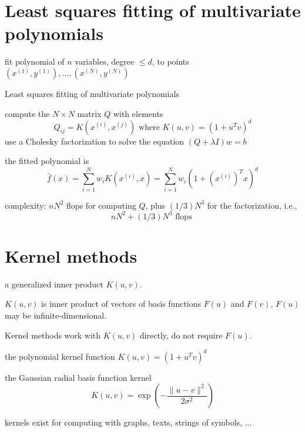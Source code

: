 \section{Least squares fitting of multivariate polynomials}

\begin{problem}
    fit polynomial of $ n $ variables, degree $ \leq d $, to points $ \left(x^{(1)}, y^{(1)}\right), \ldots,\left(x^{(N)}, y^{(N)}\right) $ 
\end{problem}

\begin{algorithm}[htbp]
    \caption{Least squares fitting of multivariate polynomials}
    compute the $ N \times N $ matrix $ Q $ with elements
$$
Q_{i j}=K\left(x^{(i)}, x^{(j)}\right) \text { where } K(u, v)=\left(1+u^{T} v\right)^{d}
$$\;
use a Cholesky factorization to solve the equation $ (Q+\lambda I) w=b $
\end{algorithm}

the fitted polynomial is
$$
\hat{f}(x)=\sum_{i=1}^{N} w_{i} K\left(x^{(i)}, x\right)=\sum_{i=1}^{N} w_{i}\left(1+\left(x^{(i)}\right)^{T} x\right)^{d}
$$


complexity: $ n N^{2} $ flops for computing $ Q $, plus $ (1 / 3) N^{3} $ for the factorization, i.e.,
$$
n N^{2}+(1 / 3) N^{3} \text { flops }
$$

\section{Kernel methods}

\begin{definition}
    a generalized inner product $ K(u, v) $.
\end{definition}

$ K(u, v) $ is inner product of vectors of basis functions $ F(u) $ and $ F(v) $, $ F(u) $ may be infinite-dimensional.

Kernel methods work with $ K(u, v) $ directly, do not require $ F(u) $.

\begin{example}
    the polynomial kernel function $ K(u, v)=\left(1+u^{T} v\right)^{d} $
\end{example}

\begin{example}
    the Gaussian radial basis function kernel
$$
K(u, v)=\exp \left(-\frac{\|u-v\|^{2}}{2 \sigma^{2}}\right)
$$
\end{example}

\begin{example}
    kernels exist for computing with graphs, texts, strings of symbols, ...
\end{example}


